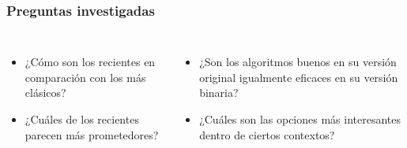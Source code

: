\begin{frame}
    \frametitle{Preguntas investigadas}
    \begin{columns}
        \begin{itemize}
            \item ¿Cómo son los recientes en comparación con los más clásicos?
            \item ¿Cuáles de los recientes parecen más prometedores?
        \end{itemize}
        \begin{itemize}
            \item ¿Son los algoritmos buenos en su versión original igualmente eficaces en su versión binaria?
            \item ¿Cuáles son las opciones más interesantes dentro de ciertos contextos?
        \end{itemize}
    \end{columns}
\end{frame}